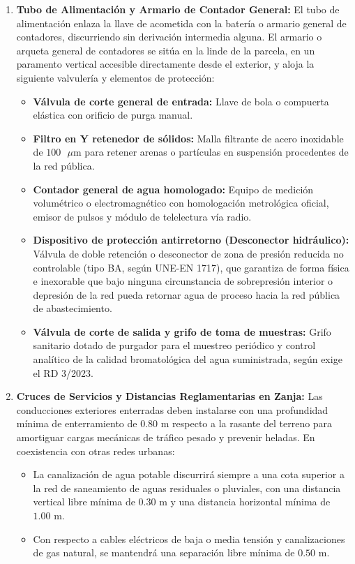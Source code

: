 \documentclass{report}
\begin{document}
\begin{enumerate}
    \item \textbf{Tubo de Alimentación y Armario de Contador General:}
          El tubo de alimentación enlaza la llave de acometida con la batería o armario general de contadores, discurriendo sin derivación intermedia alguna. El armario o arqueta general de contadores se sitúa en la linde de la parcela, en un paramento vertical accesible directamente desde el exterior, y aloja la siguiente valvulería y elementos de protección:
          \begin{itemize}
              \item \textbf{Válvula de corte general de entrada:} Llave de bola o compuerta elástica con orificio de purga manual.
              \item \textbf{Filtro en Y retenedor de sólidos:} Malla filtrante de acero inoxidable de $100\text{ }\mu\text{m}$ para retener arenas o partículas en suspensión procedentes de la red pública.
              \item \textbf{Contador general de agua homologado:} Equipo de medición volumétrico o electromagnético con homologación metrológica oficial, emisor de pulsos y módulo de telelectura vía radio.
              \item \textbf{Dispositivo de protección antirretorno (Desconector hidráulico):} Válvula de doble retención o desconector de zona de presión reducida no controlable (tipo BA, según UNE-EN 1717), que garantiza de forma física e inexorable que bajo ninguna circunstancia de sobrepresión interior o depresión de la red pueda retornar agua de proceso hacia la red pública de abastecimiento.
              \item \textbf{Válvula de corte de salida y grifo de toma de muestras:} Grifo sanitario dotado de purgador para el muestreo periódico y control analítico de la calidad bromatológica del agua suministrada, según exige el RD 3/2023.
          \end{itemize}

    \item \textbf{Cruces de Servicios y Distancias Reglamentarias en Zanja:}
          Las conducciones exteriores enterradas deben instalarse con una profundidad mínima de enterramiento de $0.80\text{ m}$ respecto a la rasante del terreno para amortiguar cargas mecánicas de tráfico pesado y prevenir heladas. En coexistencia con otras redes urbanas:
          \begin{itemize}
              \item La canalización de agua potable discurrirá siempre a una cota superior a la red de saneamiento de aguas residuales o pluviales, con una distancia vertical libre mínima de $0.30\text{ m}$ y una distancia horizontal mínima de $1.00\text{ m}$.
              \item Con respecto a cables eléctricos de baja o media tensión y canalizaciones de gas natural, se mantendrá una separación libre mínima de $0.50\text{ m}$.
          \end{itemize}
\end{enumerate}
\end{document}
